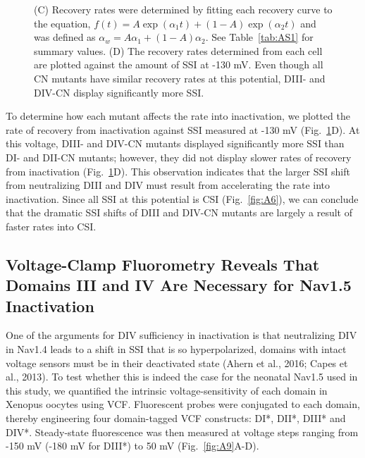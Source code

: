 \begin{figure}[t]
\begin{minipage}[c]{70mm}
{    (C) Recovery rates were determined by fitting each recovery curve to the equation, $f\left(t\right)=A\exp{(\alpha_1t)}+\left(1-A\right)\exp{\left(\alpha_2t\right)}$ and was defined as $\alpha_w=A\alpha_1+\left(1-A\right)\alpha_2$. See Table~\ref{tab:AS1} for summary values.
    (D) The recovery rates determined from each cell are plotted against the amount of SSI at -130 mV. Even though all CN mutants have similar recovery rates at this potential, DIII- and DIV-CN display significantly more SSI.}
    \label{fig:A8}
\end{minipage}
\end{figure}

To determine how each mutant affects the rate into inactivation, we plotted the rate of recovery from inactivation against SSI measured at -130 mV (Fig.~\ref{fig:A8}D). At this voltage, DIII- and DIV-CN mutants displayed significantly more SSI than DI- and DII-CN mutants; however, they did not display slower rates of recovery from inactivation (Fig.~\ref{fig:A8}D). This observation indicates that the larger SSI shift from neutralizing DIII and DIV must result from accelerating the rate into inactivation. Since all SSI at this potential is CSI (Fig.~\ref{fig:A6}), we can conclude that the dramatic SSI shifts of DIII and DIV-CN mutants are largely a result of faster rates into CSI.

\subsection{Voltage-Clamp Fluorometry Reveals That Domains III and IV Are Necessary for Nav1.5 Inactivation}
One of the arguments for DIV sufficiency in inactivation is that neutralizing DIV in Nav1.4 leads to a shift in SSI that is so hyperpolarized, domains with intact voltage sensors must be in their deactivated state (Ahern et al., 2016; Capes et al., 2013). To test whether this is indeed the case for the neonatal Nav1.5 used in this study, we quantified the intrinsic voltage-sensitivity of each domain in Xenopus oocytes using VCF. Fluorescent probes were conjugated to each domain, thereby engineering four domain-tagged VCF constructs: DI*, DII*, DIII* and DIV*. Steady-state fluorescence was then measured at voltage steps ranging from -150 mV (-180 mV for DIII*) to 50 mV (Fig.~\ref{fig:A9}A-D).

